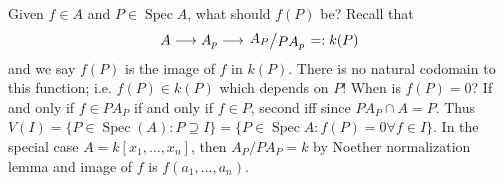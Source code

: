 \documentclass[11pt, a4paper]{memoir}
\newcommand{\lto}[0]{\ensuremath{\longrightarrow}}
\theoremstyle{change}
\theoremstyle{plain}
\theoremstyle{nonumberplain}
\DeclareMathOperator{\Spec}{Spec}
\newcommand{\quot}[2]{\mathchoice{\left.\raisebox{0.12em}{$#1$}\middle/\raisebox{-0.12em}{$#2$}\right.}
                                 {\left.\raisebox{0.06em}{$#1$}\middle/\raisebox{-0.06em}{$#2$}\right.}
                                 {\left.\raisebox{0.02em}{$#1$}\middle/\raisebox{-0.02em}{$#2$}\right.}
                                 {\left.\raisebox{0em}{$#1$}\middle/\raisebox{0em}{$#2$}\right.}}
\numberwithin{equation}{section}
\begin{document}
Given $f\in A$ and $P\in\Spec A$, what should $f(P)$ be?
Recall that
\begin{equation*}
    A\lto A_p\lto \quot{A_P}{PA_p}=:k(P)
\end{equation*}
and we say $f(P)$ is the image of $f$ in $k(P)$.
There is no natural codomain to this function; i.e. $f(P)\in k(P)$ which depends on $P$!
When is $f(P)=0$?
If and only if $f\in PA_P$ if and only if $f\in P$, second iff since $PA_P\cap A=P$.
Thus $V(I)=\{P\in\Spec(A):P\supseteq I\}=\{P\in\Spec A:f(P)=0\forall f\in I\}$.
In the special case $A=k[x_1,\ldots,x_n]$, then $A_P/PA_P=k$ by Noether normalization lemma and image of $f$ is $f(a_1,\ldots,a_n)$.
\end{document}
